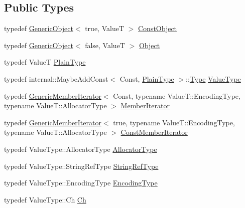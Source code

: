 \subsection*{Public Types}
\begin{DoxyCompactItemize}
\item 
typedef \hyperlink{classGenericObject}{Generic\+Object}$<$ true, ValueT $>$ \hyperlink{classGenericObject_aeee588f9a85e88cac89b7c4dfb6b0bd3}{Const\+Object}
\item 
typedef \hyperlink{classGenericObject}{Generic\+Object}$<$ false, ValueT $>$ \hyperlink{classGenericObject_ae8f5673d0cf8e7ebfd2d4f6ab27b632d}{Object}
\item 
typedef ValueT \hyperlink{classGenericObject_a4c25f4a5f696745c418b91ad9f577f12}{Plain\+Type}
\item 
typedef internal\+::\+Maybe\+Add\+Const$<$ Const, \hyperlink{classGenericObject_a4c25f4a5f696745c418b91ad9f577f12}{Plain\+Type} $>$\+::\hyperlink{rapidjson_8h_a1d1cfd8ffb84e947f82999c682b666a7}{Type} \hyperlink{classGenericObject_a930aa30f89caee7ba7bff60bf9dc21b1}{Value\+Type}
\item 
typedef \hyperlink{classGenericMemberIterator}{Generic\+Member\+Iterator}$<$ Const, typename Value\+T\+::\+Encoding\+Type, typename Value\+T\+::\+Allocator\+Type $>$ \hyperlink{classGenericObject_a1f531d70f8d57ed30199ac445b5935e6}{Member\+Iterator}
\item 
typedef \hyperlink{classGenericMemberIterator}{Generic\+Member\+Iterator}$<$ true, typename Value\+T\+::\+Encoding\+Type, typename Value\+T\+::\+Allocator\+Type $>$ \hyperlink{classGenericObject_af16706c0ad32b957c56e7d0541628cd5}{Const\+Member\+Iterator}
\item 
typedef Value\+Type\+::\+Allocator\+Type \hyperlink{classGenericObject_a00c8cee952d5ebadc5e1c309aa489ad9}{Allocator\+Type}
\item 
typedef Value\+Type\+::\+String\+Ref\+Type \hyperlink{classGenericObject_a9b8381fc96f5f89b2163b052ed66cc59}{String\+Ref\+Type}
\item 
typedef Value\+Type\+::\+Encoding\+Type \hyperlink{classGenericObject_a96ebfdde095e2ce42535d15ae5dc58ef}{Encoding\+Type}
\item 
typedef Value\+Type\+::\+Ch \hyperlink{classGenericObject_ac6747e5baa13e15bcea1658b5624647a}{Ch}
\end{DoxyCompactItemize}
